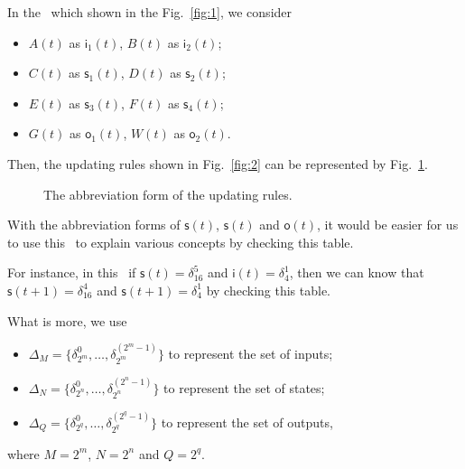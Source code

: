 In the \BCN\ which shown in the Fig.~\ref{fig:1}, we consider 
\begin{itemize}
  \item $A(t)$ as $\mathsf{i}_{1}(t)$, $B(t)$ as $\mathsf{i}_{2}(t)$;
  \item $C(t)$ as $\mathsf{s}_{1}(t)$, $D(t)$ as $\mathsf{s}_{2}(t)$;
  \item $E(t)$ as $\mathsf{s}_{3}(t)$, $F(t)$ as $\mathsf{s}_{4}(t)$;
  \item $G(t)$ as $\mathsf{o}_{1}(t)$, $W(t)$ as $\mathsf{o}_{2}(t)$.
\end{itemize}

Then, the updating rules shown in Fig.~\ref{fig:2} can be represented by Fig.~\ref{fig:6}.
 \begin{figure}[thpb]
      \centering
      
      \caption{The abbreviation form of the updating rules.}
      \label{fig:6}
   \end{figure}
  
   With the abbreviation forms of $\mathsf{s}(t)$, $\mathsf{s}(t)$ and $\mathsf{o}(t)$, it would be easier for us to use this \BCN\ to explain various concepts by checking this table.
   
   For instance, in this \BCN\ if $\mathsf{s}(t)=\delta^5_{16}$ and $\mathsf{i}(t)=\delta^1_{4}$, then we can know that $\mathsf{s}(t+1)=\delta^4_{16}$  and $\mathsf{s}(t+1)=\delta^1_{4}$ by checking this table. 
   
    What is more, we use 
   \begin{itemize}
 \item $\Delta_M=\{\delta^0_{2^m},\ldots,\delta^{({2^m}-1)}_{2^m} \}$ to represent the set of inputs; 
 \item $\Delta_N=\{\delta^0_{2^n},\ldots,\delta^{({2^n}-1)}_{2^n} \}$ to represent the set of states; 
  \item $\Delta_Q=\{\delta^0_{2^q},\ldots,\delta^{({2^q}-1)}_{2^q} \}$ to represent the set of outputs,
\end{itemize}
where $M=2^m$, $N=2^n$ and $Q=2^q$.


